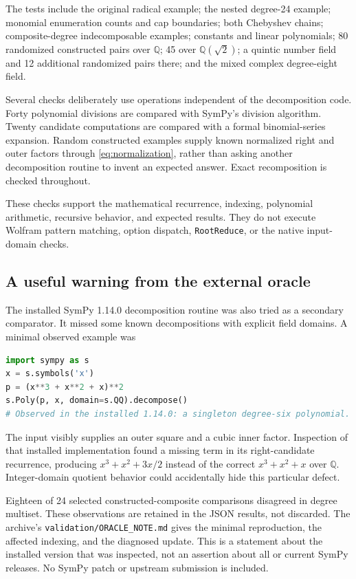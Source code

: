 \documentclass[11pt,letterpaper]{article}
\theoremstyle{definition}
\theoremstyle{remark}
\newcommand{\Q}{\mathbb Q}
\newcommand{\wt}[1]{\texttt{#1}}
\begin{document}
The tests include the original radical example; the nested degree-24
example; monomial enumeration counts and cap boundaries; both Chebyshev
chains; composite-degree indecomposable examples; constants and linear
polynomials; 80 randomized constructed pairs over $\Q$; 45 over
$\Q(\sqrt2)$; a quintic number field and 12 additional randomized
pairs there; and the mixed complex degree-eight field.

Several checks deliberately use operations independent of the
decomposition code. Forty polynomial divisions are compared with
SymPy's division algorithm. Twenty candidate computations are compared
with a formal binomial-series expansion. Random constructed examples
supply known normalized right and outer factors through
\eqref{eq:normalization}, rather than asking another decomposition
routine to invent an expected answer. Exact recomposition is checked
throughout.

These checks support the mathematical recurrence, indexing, polynomial
arithmetic, recursive behavior, and expected results. They do not execute
Wolfram pattern matching, option dispatch, \wt{RootReduce}, or the native
input-domain checks.

\subsection{A useful warning from the external oracle}
The installed SymPy 1.14.0 decomposition routine was also tried as a
secondary comparator. It missed some known decompositions with explicit
field domains. A minimal observed example was
\begin{lstlisting}[language=Python]
import sympy as s
x = s.symbols('x')
p = (x**3 + x**2 + x)**2
s.Poly(p, x, domain=s.QQ).decompose()
# Observed in the installed 1.14.0: a singleton degree-six polynomial.
\end{lstlisting}
The input visibly supplies an outer square and a cubic inner factor.
Inspection of that installed implementation found a missing term in its
right-candidate recurrence, producing $x^3+x^2+3x/2$ instead of the
correct $x^3+x^2+x$ over $\Q$. Integer-domain quotient behavior could
accidentally hide this particular defect.

Eighteen of 24 selected constructed-composite comparisons disagreed in
degree multiset. These observations are retained in the JSON results,
not discarded. The archive's \wt{validation/ORACLE\_NOTE.md} gives the
minimal reproduction, the affected indexing, and the diagnosed update.
This is a statement about the installed version that was inspected, not
an assertion about all or current SymPy releases. No SymPy patch or
upstream submission is included.
\end{document}
